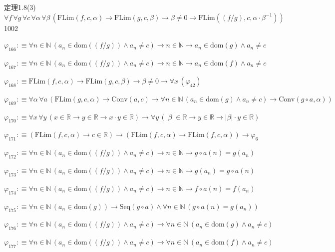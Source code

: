 \begin{fullproof}{定理1.8(3)}{$\forall f\,\forall g\,\forall c\,\forall \alpha\,\forall \beta\,(\mathrm{FLim}(f,c,\alpha) \to \mathrm{FLim}(g,c,\beta) \to \beta \neq 0 \to \mathrm{FLim}((f / g),c,\alpha \cdot \beta^{-1}))$}{1002}
\begin{abbrevlist}
\item $\varphi_{166} :\equiv \forall n \in \mathbb{N}\,(a_{n} \in \mathrm{dom}((f / g)) \land a_{n} \neq c) \to n \in \mathbb{N} \to a_{n} \in \mathrm{dom}(g) \land a_{n} \neq c$
\item $\varphi_{167} :\equiv \forall n \in \mathbb{N}\,(a_{n} \in \mathrm{dom}((f / g)) \land a_{n} \neq c) \to n \in \mathbb{N} \to a_{n} \in \mathrm{dom}(f) \land a_{n} \neq c$
\item $\varphi_{168} :\equiv \mathrm{FLim}(f,c,\alpha) \to \mathrm{FLim}(g,c,\beta) \to \beta \neq 0 \to \forall x\,(\varphi_{42})$
\item $\varphi_{169} :\equiv \forall \alpha\,\forall a\,(\mathrm{FLim}(g,c,\alpha) \to \mathrm{Conv}(a,c) \to \forall n \in \mathbb{N}\,(a_{n} \in \mathrm{dom}(g) \land a_{n} \neq c) \to \mathrm{Conv}(g \circ a,\alpha))$
\item $\varphi_{170} :\equiv \forall x\,\forall y\,(x \in \mathbb{R} \to y \in \mathbb{R} \to x \cdot y \in \mathbb{R}) \to \forall y\,(\lvert \beta \rvert \in \mathbb{R} \to y \in \mathbb{R} \to \lvert \beta \rvert \cdot y \in \mathbb{R})$
\item $\varphi_{171} :\equiv (\mathrm{FLim}(f,c,\alpha) \to c \in \mathbb{R}) \to (\mathrm{FLim}(f,c,\alpha) \to \mathrm{FLim}(f,c,\alpha)) \to \varphi_{6}$
\item $\varphi_{172} :\equiv \forall n \in \mathbb{N}\,(a_{n} \in \mathrm{dom}((f / g)) \land a_{n} \neq c) \to n \in \mathbb{N} \to g \circ a(n) = g(a_{n})$
\item $\varphi_{173} :\equiv \forall n \in \mathbb{N}\,(a_{n} \in \mathrm{dom}((f / g)) \land a_{n} \neq c) \to n \in \mathbb{N} \to g(a_{n}) = g \circ a(n)$
\item $\varphi_{174} :\equiv \forall n \in \mathbb{N}\,(a_{n} \in \mathrm{dom}((f / g)) \land a_{n} \neq c) \to n \in \mathbb{N} \to f \circ a(n) = f(a_{n})$
\item $\varphi_{175} :\equiv \forall n \in \mathbb{N}\,(a_{n} \in \mathrm{dom}(g)) \to \mathrm{Seq}(g \circ a) \land \forall n \in \mathbb{N}\,(g \circ a(n) = g(a_{n}))$
\item $\varphi_{176} :\equiv \forall n \in \mathbb{N}\,(a_{n} \in \mathrm{dom}((f / g)) \land a_{n} \neq c) \to \forall n \in \mathbb{N}\,(a_{n} \in \mathrm{dom}(g) \land a_{n} \neq c)$
\item $\varphi_{177} :\equiv \forall n \in \mathbb{N}\,(a_{n} \in \mathrm{dom}((f / g)) \land a_{n} \neq c) \to \forall n \in \mathbb{N}\,(a_{n} \in \mathrm{dom}(f) \land a_{n} \neq c)$

\end{abbrevlist}
\end{fullproof}
